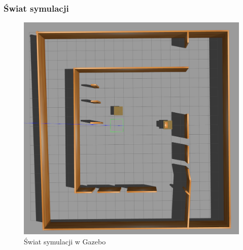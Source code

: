 \begin{frame}
	\frametitle{Świat symulacji}
	\begin{figure}[b]
        \label{sim_world}
        \centering
        \def\svgwidth{\columnwidth}
        \includegraphics[scale=0.23]{images/gazebo_world.png}
        \caption{Świat symulacji w Gazebo}
    \end{figure}
\end{frame}

